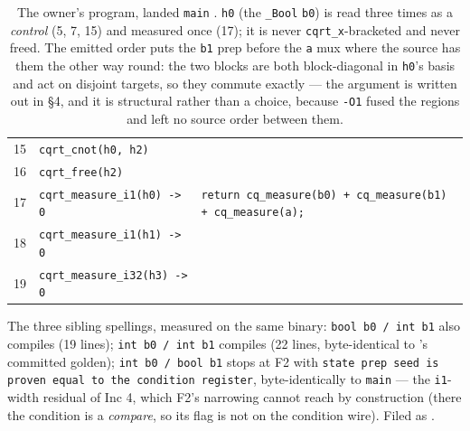 \begin{table}[h]
\begin{tabular}{@{}rll@{}}
15 & \texttt{cqrt\_cnot(h0, h2)}               & \\
16 & \texttt{cqrt\_free(h2)}                   & \\[2pt]
17 & \texttt{cqrt\_measure\_i1(h0) -> 0}       & \texttt{return cq\_measure(b0) + cq\_measure(b1) + cq\_measure(a);} \\
18 & \texttt{cqrt\_measure\_i1(h1) -> 0}       & \\
19 & \texttt{cqrt\_measure\_i32(h3) -> 0}      & \\
\bottomrule\end{tabular}
\caption{The owner's program, landed \texttt{main} . \texttt{h0} (the \texttt{\_Bool}
\texttt{b0}) is read three times as a \emph{control} (5, 7, 15) and measured once (17); it is never
\texttt{cqrt\_x}-bracketed and never freed. The emitted order puts the \texttt{b1} prep before the
\texttt{a} mux where the source has them the other way round: the two blocks are both block-diagonal in
\texttt{h0}'s basis and act on disjoint targets, so they commute exactly --- the argument is written out
in  \S4, and it is structural rather than a choice, because \texttt{-O1} fused the
regions and left no source order between them.}
\end{table}

The three sibling spellings, measured on the same binary: \texttt{bool b0 / int b1} also compiles (19
lines); \texttt{int b0 / int b1} compiles (22 lines, byte-identical to 's committed golden);
\texttt{int b0 / bool b1} stops at F2 with \texttt{state prep seed is proven equal to the condition
register}, byte-identically to \texttt{main} --- the \texttt{i1}-width residual of  Inc 4, which
F2's narrowing cannot reach by construction (there the condition is a \emph{compare}, so its flag is not
on the condition wire). Filed as .

